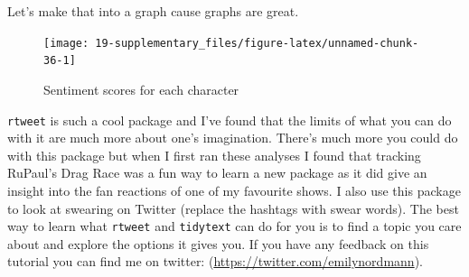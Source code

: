\documentclass[]{book}
\newenvironment{Shaded}{\begin{snugshade}}{\end{snugshade}}
\newcommand{\DataTypeTok}[1]{\textcolor[rgb]{0.13,0.29,0.53}{#1}}
\newcommand{\DecValTok}[1]{\textcolor[rgb]{0.00,0.00,0.81}{#1}}
\newcommand{\KeywordTok}[1]{\textcolor[rgb]{0.13,0.29,0.53}{\textbf{#1}}}
\newcommand{\NormalTok}[1]{#1}
\newcommand{\OperatorTok}[1]{\textcolor[rgb]{0.81,0.36,0.00}{\textbf{#1}}}
\newcommand{\OtherTok}[1]{\textcolor[rgb]{0.56,0.35,0.01}{#1}}
\newcommand{\StringTok}[1]{\textcolor[rgb]{0.31,0.60,0.02}{#1}}
\begin{document}
Let's make that into a graph cause graphs are great.

\begin{Shaded}
\end{Shaded}

\begin{figure}

{\centering \texttt{[image: 19-supplementary\_files/figure-latex/unnamed-chunk-36-1]} 

}

\caption{Sentiment scores for each character}\label{fig:unnamed-chunk-36}
\end{figure}

\texttt{rtweet} is such a cool package and I've found that the limits of what you can do with it are much more about one's imagination. There's much more you could do with this package but when I first ran these analyses I found that tracking RuPaul's Drag Race was a fun way to learn a new package as it did give an insight into the fan reactions of one of my favourite shows. I also use this package to look at swearing on Twitter (replace the hashtags with swear words). The best way to learn what \texttt{rtweet} and \texttt{tidytext} can do for you is to find a topic you care about and explore the options it gives you. If you have any feedback on this tutorial you can find me on twitter: \citep{emilynordmann}(\url{https://twitter.com/emilynordmann}).
\end{document}
